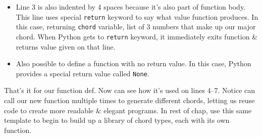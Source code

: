 \documentclass{article}
\begin{document}
\begin{itemize}
\begin{itemize}
\begin{itemize}
			\item Line 3 is also indented by 4 spaces because it's also part of function body. This line uses special {\tt return} keyword to say what value function produces. In this case, returning {\tt chord} variable, list of 3 numbers that make up our major chord. When Python gets to {\tt return} keyword, it immediately exits function \& returns value given on that line.
			\item Also possible to define a function with no return value. In this case, Python provides a special return value called {\tt None}.
		\end{itemize}
		That's it for our function def. Now can see how it's used on lines 4--7. Notice can call our new function multiple times to generate different chords, letting us reuse code to create more readable \& elegant programs. In rest of chap, use this same template to begin to build up a library of chord types, each with its own function.
		

\end{itemize}
\end{itemize}
\end{document}

